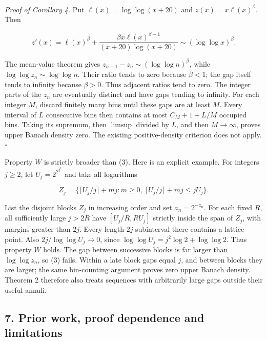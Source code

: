 \documentclass[
  11pt,
]{article}
\begin{document}
\emph{Proof of Corollary 4.} Put \(\ell (x)=\log\log (x+20)\) and
\(z(x)=x \ell (x)^\beta\). Then

\[
 z'(x)=\ell(x)^\beta+
 \frac{\beta x\ell(x)^{\beta-1}}{(x+20)\log(x+20)}
       \sim(\log\log x)^\beta.                              \tag{27}
\]

The mean-value theorem gives \(z_{n+1}-z_n\sim (\log\log  n)^\beta\),
while \(\log\log  z_n\sim \log\log  n\). Their ratio tends to zero
because \(\beta <1\); the gap itself tends to infinity because
\(\beta >0\). Thus adjacent ratios tend to zero. The integer parts of
the \(z_n\) are eventually distinct and have gaps tending to infinity.
For each integer \(M\), discard finitely many bins until these gaps are
at least \(M\). Every interval of \(L\) consecutive bins then contains
at most \(C_M+1+L/M\) occupied bins. Taking its supremum, then
\(\limsup\) divided by \(L\), and then \(M\to \infty\), proves upper
Banach density zero. The existing positive-density criterion does not
apply. \(\square\)

Property \(W\) is strictly broader than (3). Here is an explicit
example. For integers \(j\ge 2\), let \(U_j=2^{2^{j^2}}\) and take all
logarithms

\[
 Z_j=\{\lceil U_j/j\rceil+mj:m\ge0,
                    \ \lceil U_j/j\rceil+mj\le jU_j\}.     \tag{28}
\]

List the disjoint blocks \(Z_j\) in increasing order and set
\(a_n=2^{-z_n}\). For each fixed \(R\), all sufficiently large \(j>2R\)
have \([U_j/R,RU_j]\) strictly inside the span of \(Z_j\), with margins
greater than \(2j\). Every length-\(2j\) subinterval there contains a
lattice point. Also \(2j/\log\log  U_j\to 0\), since
\(\log\log  U_j=j^2 \log 2+\log\log 2\). Thus property \(W\) holds. The
gap between successive blocks is far larger than \(\log\log  z_n\), so
(3) fails. Within a late block gaps equal \(j\), and between blocks they
are larger; the same bin-counting argument proves zero upper Banach
density. Theorem 2 therefore also treats sequences with arbitrarily
large gaps outside their useful annuli.

\subsection{7. Prior work, proof dependence and
limitations}\label{prior-work-proof-dependence-and-limitations}
\end{document}

